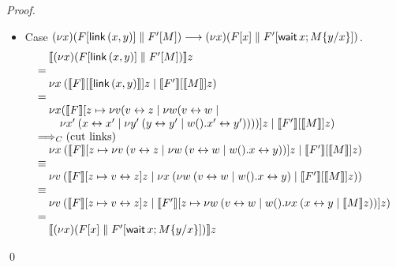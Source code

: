 \documentclass[oribibl,orivec,envcountsame]{llncs}
\begin{document}
\begin{proof}
\begin{itemize}
\item Case $(\nu x) (F[\mathsf{link} \, (x, y)] \parallel F'[M]) \longrightarrow
          (\nu x)(F[x] \parallel F'[\mathsf{wait} \, x; M\{y/x\}])$.
\[
\bl
\quad \tocp{(\nu x) (\Fx[\gvconst{link} \app (x, y)] \parallel \Fx'[M])}z \\
= \\
\quad \cut{x}{}
         {\tocp{\Fx}[\tocp{\gvconst{link} \app (x, y)}]z}
         {\tocp{\Fx'}[\tocp{M}]z} \\
= \\
\quad \nu x
         (\tocp{\Fx}[z \mapsto
                       \nu v (\link v z \mid
                         \nu w (\link v w \mid \\
\qquad
                           {\cut{x'}{}
                             {\link{x}{x'}}
                             {\cut{y'}{}{\link{y}{y'}}{w().\link{x'}{y'}}}}))]z \mid
         {\tocp{\Fx'}[\tocp{M}]z}) \\
\bigcrto (\text{cut links}) \\
\quad \cut{x}{}
         {\tocp{\Fx}[z \mapsto
                       \cut{v}{}{\link v z}
                         {\cut{w}{}{\link v w}
                            {w().\link{x}{y}}}]z}
         {\tocp{\Fx'}[\tocp{M}]z} \\
\equiv \\
\quad \cut{v}{}
         {\tocp{\Fx}[z \mapsto \link v z]z}
         {\cut{x}{}
           {\cut{w}{}
              {\link v w}
              {w().\link{x}{y}}}
           {\tocp{\Fx'}[\tocp{M}]z}} \\
\equiv \\
\quad
  \cut{v}{}
    {\tocp{\Fx}[z \mapsto \link v z]z}
    {\tocp{\Fx'}[z \mapsto
                  \cut{w}{}
                     {\link v w}
                     {w().\cut{x}{}{\link x y}{\tocp{M}z}}]z} \\
= \\
\quad \tocp{(\nu x)(\Fx[x] \parallel \Fx'[\gvletunit{\gvconst{wait} \app x}{M\{y/x\}}])}z
\el
\]
\end{itemize}
\qed
\end{proof}
\end{document}
